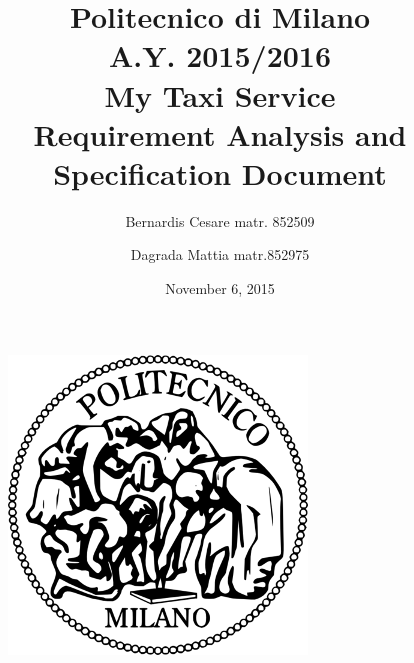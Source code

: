 \documentclass[11pt,a4paper,titlepage]{article}
\begin{document}
\begin{figure}
	\centering
	\includegraphics[scale=0.6]{../SE2_IMAGES/Logo_Politecnico_Milano}
\end{figure}
\title{Politecnico di Milano\\A.Y. 2015/2016\\\textbf{My Taxi Service}\\Requirement Analysis and Specification Document\\}
\author{Bernardis Cesare matr. 852509 \and Dagrada Mattia matr.852975}
\date{November 6, 2015}
\maketitle

\newpage

\tableofcontents

\newpage




\end{document}
